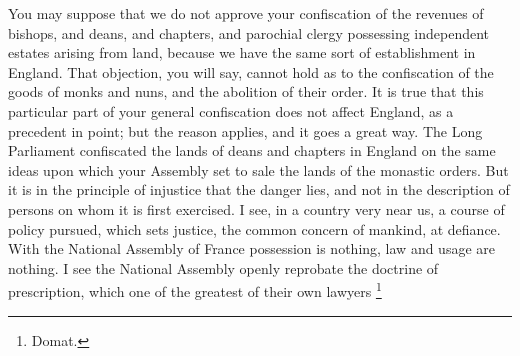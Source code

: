 You may suppose that we do not approve your confiscation of the revenues of bishops, and deans, and chapters, and parochial clergy possessing independent estates arising from land, because we have the same sort of establishment in England. That objection, you will say, cannot hold as to the confiscation of the goods of monks and nuns, and the abolition of their order. It is true that this particular part of your general confiscation does not affect England, as a precedent in point; but the reason applies, and it goes a great way. The Long Parliament confiscated the lands of deans and chapters in England on the same ideas upon which your Assembly set to sale the lands of the monastic orders. But it is in the principle of injustice that the danger lies, and not in the description of persons on whom it is first exercised. I see, in a country very near us, a course of policy pursued, which sets justice, the common concern of mankind, at defiance. With the National Assembly of France possession is nothing, law and usage are nothing. I see the National Assembly openly reprobate the doctrine of prescription, which one of the greatest of their own lawyers
\footnote{ Domat.}
